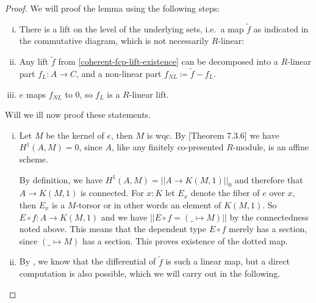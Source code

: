 \begin{proof}
  We will proof the lemma using the following steps:
  \begin{enumerate}[(i)]
  \item \label{coherent-fcp-lift-existence} There is a lift on the level of the underlying sets, i.e.\ a map $\tilde{f}$ as indicated in the commutative diagram, which is not necessarily $R$-linear:
    \begin{center}
    \end{center}
  \item Any lift $\tilde{f}$ from \ref{coherent-fcp-lift-existence} can be decomposed into a $R$-linear part $f_L:A\to C$, and a non-linear part $f_{NL}\coloneq\tilde{f}-f_L$.
  \item $e$ maps $f_{NL}$ to $0$, so $f_L$ is a $R$-linear lift.
  \end{enumerate}
  Will we ill now proof these statements.
  \begin{enumerate}[(i)]
  \item Let $M$ be the kernel of $e$, then $M$ is wqc.
  By \cite{draft}[Theorem 7.3.6] we have $H^1(A,M)=0$, since $A$, like any finitely co-presented $R$-module, is an affine scheme.

  By definition, we have $H^1(A,M)=||A\to K(M,1)||_0$ and therefore that $A\to K(M,1)$ is connected.
  For $x:K$ let $E_x$ denote the fiber of $e$ over $x$, then $E_x$ is a $M$-torsor or in other words an element of $K(M,1)$.
  So $E\circ f:A\to K(M,1)$ and we have $|| E\circ f = (\_\mapsto M) ||$ by the connectedness noted above.
  This means that the dependent type $E\circ f$ merely has a section, since $(\_\mapsto M)$ has a section.
  This proves existence of the dotted map.
  \item By \cite{diffgeo-article}, we know that the differential of $\tilde{f}$ is such a linear map,
  but a direct computation is also possible, which we will carry out in the following.
  

\end{enumerate}
\end{proof}

